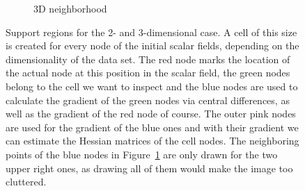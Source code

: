 \begin{figure}[ht]
\begin{subfigure}[b]{0.49\textwidth}
    \caption{3D neighborhood}
    \label{fig:3DNH}
  \end{subfigure}
  \caption{Support regions for the 2- and 3-dimensional case. A cell of
  this size is created for every node of the initial scalar fields,
  depending on the dimensionality of the data set. The red node marks
  the location of the actual node at this position in the scalar field,
  the green nodes belong to the cell we want to inspect and the blue
  nodes are used to calculate the gradient of the green nodes via
  central differences, as well as the gradient of the red node of
  course. The outer pink nodes are used for the gradient of the blue
  ones and with their gradient we can estimate the Hessian
  matrices of the cell nodes. The neighboring points of the blue nodes
  in Figure~\ref{fig:3DNH} are only drawn for the two upper right ones,
  as drawing all of them would make the image too cluttered.}
  \label{fig:NH}
\end{figure}

